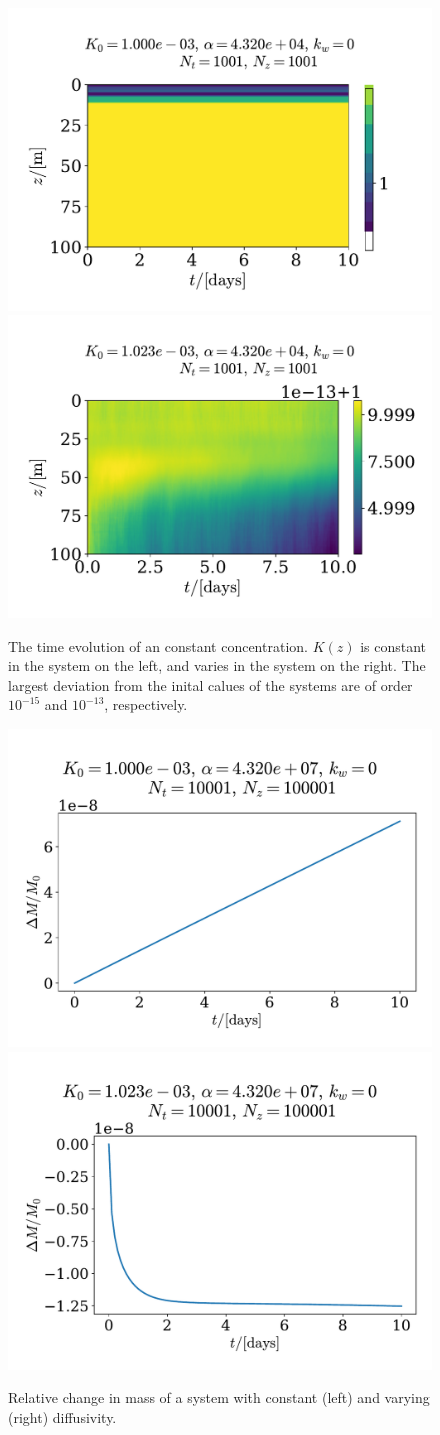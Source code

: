 \documentclass{article}
\begin{document}
    \begin{figure}[H]
        \centering
        \includegraphics[width=.49\textwidth]{../plots/test1}
        \includegraphics[width=.49\textwidth]{../plots/test1_varK}
        \caption{The time evolution of an constant concentration. $K(z)$ is constant in the system on the left, and varies in the system on the right. The largest deviation from the inital calues of the systems are of order $10^{-15}$ and $10^{-13}$, respectively.}
        \label{constant_cons}
    \end{figure}

    \begin{figure}[H]
        \centering
        \includegraphics[width=.49\textwidth]{../plots/test2_m}
        \includegraphics[width=.49\textwidth]{../plots/test2_varK_m}
        \caption{Relative change in mass of a system with constant (left) and varying (right) diffusivity.}
        \label{Consv mass}
    \end{figure}
\end{document}
